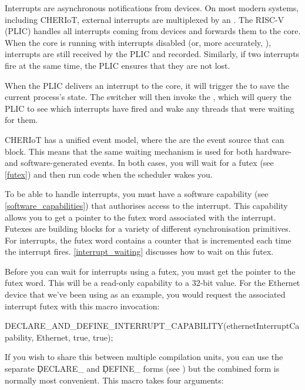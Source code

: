 Interrupts are asynchronous notifications from devices.
On most modern systems, including CHERIoT, external interrupts are multiplexed by an .
The RISC-V  (PLIC) handles all interrupts coming from devices and forwards them to the core.
When the core is running with interrupts disabled (or, more accurately, ), interrupts are still received by the PLIC and recorded.
Similarly, if two interrupts fire at the same time, the PLIC ensures that they are not lost.

When the PLIC delivers an interrupt to the core, it will trigger the  to save the current process's state.
The switcher will then invoke the , which will query the PLIC to see which interrupts have fired and wake any threads that were waiting for them.

CHERIoT has a unified event model, where the  are the  event source that can block.
This means that the same waiting mechanism is used for both hardware- and software-generated events.
In both cases, you will wait for a futex (see \ref{futex}) and then run code when the scheduler wakes you.

To be able to handle interrupts, you must have a software capability (see \ref{software_capabilities}) that authorises access to the interrupt.
This capability allows you to get a pointer to the futex word associated with the interrupt.
Futexes are building blocks for a variety of different synchronisation primitives.
For interrupts, the futex word contains a counter that is incremented each time the interrupt fires.
\ref{interrupt_waiting} discusses how to wait on this futex.

Before you can wait for interrupts using a futex, you must get the pointer to the futex word.
This will be a read-only capability to a 32-bit value.
For the Ethernet device that we've been using as an example, you would request the associated interrupt futex with this macro invocation:

\begin{cxxsnippet}
DECLARE_AND_DEFINE_INTERRUPT_CAPABILITY(ethernetInterruptCapability, Ethernet, true, true);
\end{cxxsnippet}

If you wish to share this between multiple compilation units, you can use the separate \c{DECLARE_} and \c{DEFINE_} forms (see ) but the combined form is normally most convenient.
This macro takes four arguments:


